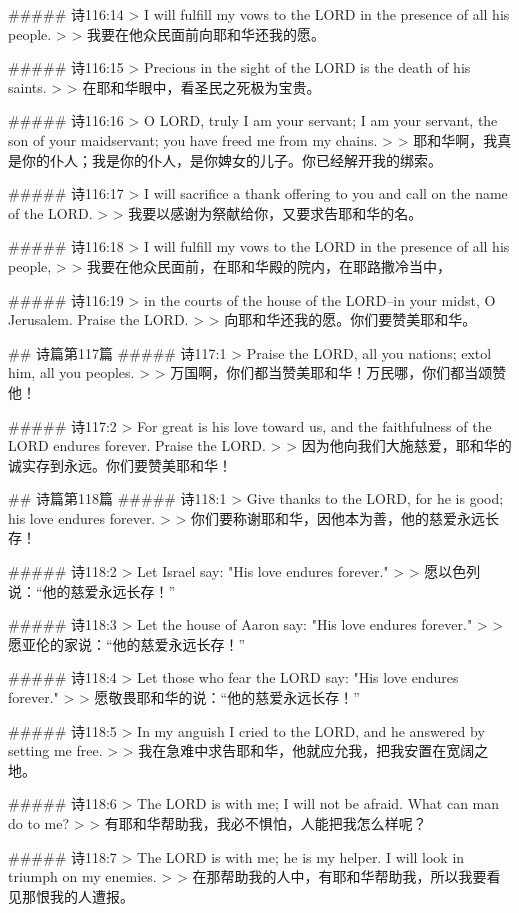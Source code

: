 ##### 诗116:14
> I will fulfill my vows to the LORD in the presence of all his people.
>
> 我要在他众民面前向耶和华还我的愿。


##### 诗116:15
> Precious in the sight of the LORD is the death of his saints.
>
> 在耶和华眼中，看圣民之死极为宝贵。


##### 诗116:16
> O LORD, truly I am your servant; I am your servant, the son of your maidservant; you have freed me from my chains.
>
> 耶和华啊，我真是你的仆人；我是你的仆人，是你婢女的儿子。你已经解开我的绑索。


##### 诗116:17
> I will sacrifice a thank offering to you and call on the name of the LORD.
>
> 我要以感谢为祭献给你，又要求告耶和华的名。


##### 诗116:18
> I will fulfill my vows to the LORD in the presence of all his people,
>
> 我要在他众民面前，在耶和华殿的院内，在耶路撒冷当中，


##### 诗116:19
> in the courts of the house of the LORD--in your midst, O Jerusalem. Praise the LORD.
>
> 向耶和华还我的愿。你们要赞美耶和华。


## 诗篇第117篇
##### 诗117:1
> Praise the LORD, all you nations; extol him, all you peoples.
>
> 万国啊，你们都当赞美耶和华！万民哪，你们都当颂赞他！


##### 诗117:2
> For great is his love toward us, and the faithfulness of the LORD endures forever. Praise the LORD.
>
> 因为他向我们大施慈爱，耶和华的诚实存到永远。你们要赞美耶和华！


## 诗篇第118篇
##### 诗118:1
> Give thanks to the LORD, for he is good; his love endures forever.
>
> 你们要称谢耶和华，因他本为善，他的慈爱永远长存！


##### 诗118:2
> Let Israel say: "His love endures forever."
>
> 愿以色列说：“他的慈爱永远长存！”


##### 诗118:3
> Let the house of Aaron say: "His love endures forever."
>
> 愿亚伦的家说：“他的慈爱永远长存！”


##### 诗118:4
> Let those who fear the LORD say: "His love endures forever."
>
> 愿敬畏耶和华的说：“他的慈爱永远长存！”


##### 诗118:5
> In my anguish I cried to the LORD, and he answered by setting me free.
>
> 我在急难中求告耶和华，他就应允我，把我安置在宽阔之地。


##### 诗118:6
> The LORD is with me; I will not be afraid. What can man do to me?
>
> 有耶和华帮助我，我必不惧怕，人能把我怎么样呢？


##### 诗118:7
> The LORD is with me; he is my helper. I will look in triumph on my enemies.
>
> 在那帮助我的人中，有耶和华帮助我，所以我要看见那恨我的人遭报。


